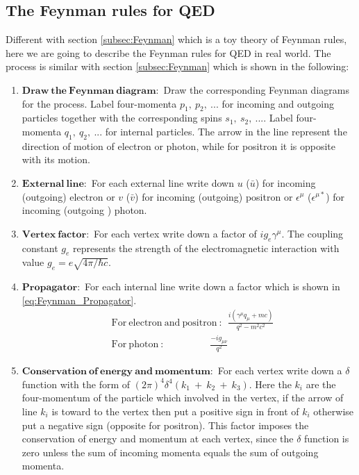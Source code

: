 \subsection{The Feynman rules for QED}\label{subsec:Feynman_QED}
Different with section \ref{subsec:Feynman} which is a toy theory of Feynman rules, here we are going to describe the Feynman rules for QED in real world. The process is similar with section \ref{subsec:Feynman} which is shown in the following:
\begin{enumerate}
\item $\mathbf{Draw~the~Feynman~diagram:}$ Draw the corresponding Feynman diagrams for the process. Label four-momenta $p_{1},~p_{2},~...$ for incoming and outgoing particles together with the corresponding spins $s_{1},~s_{2},~...$. Label four-momenta $q_{1},~q_{2},~...$ for internal particles. The arrow in the line represent the direction of motion of electron or photon, while for positron it is opposite with its motion.
\item $\mathbf{External~line:}$ For each external line write down $u$ ($\bar{u}$) for incoming (outgoing) electron or $v$ ($\bar{v}$) for incoming (outgoing) positron or  $\epsilon^{\mu}$ ($\epsilon^{\mu\ast}$) for incoming (outgoing ) photon.
\item $\mathbf{Vertex~factor:}$ For each vertex write down a factor of $ig_{e}\gamma^{\mu}$. The coupling constant $g_{e}$ represents the strength of the electromagnetic interaction with value $g_{e}=e\sqrt{4\pi/\hbar c}$.
\item $\mathbf{Propagator:}$ For each internal line write down a factor which is shown in \ref{eq:Feynman_Propagator}.
\begin{equation}
\begin{split}
&\mathrm{For~electron~and~positron~:}~~\frac{i(\gamma^{\mu}q_{\mu}+mc)}{q^{2}-m^{2}c^{2}} \\
&\mathrm{For~photon~:}~~~~~~~~~~~~~~~~~~~~~\frac{-ig_{\mu\nu}}{q^{2}}
\end{split}
\label{eq:Feynman_Propagator}
\end{equation}
\item $\mathbf{Conservation~of~energy~and~momentum:}$ For each vertex write down a $\delta$ function with the form of $(2\pi)^{4}\delta^{4}(k_{1}~+~k_{2}~+~k_{3})$. Here the $k_{i}$ are the four-momentum of the particle which involved in the vertex, if the arrow of line $k_{i}$ is toward to the vertex then put a positive sign in front of $k_{i}$ otherwise put a negative sign (opposite for positron). This factor imposes the conservation of energy and momentum at each vertex, since the $\delta$ function is zero unless the sum of incoming momenta equals the sum of outgoing momenta.

\end{enumerate}

